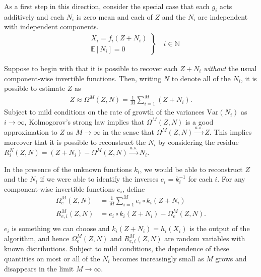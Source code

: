 As a first step in this direction, consider the special case that each ${g}_i$ acts additively and each $N_i$ is zero mean and each of $Z$ and the $N_i$ are independent with independent components.
\begin{align}
\left.
\begin{array}{ll}
&X_{i}={f}_{i}(Z + N_{i}) \\
&\mathbb{E}[N_i]= 0
\end{array}
\right\rbrace \quad i \in \mathbb{N}
\end{align}

Suppose to begin with that it is possible to recover each $Z + N_i$ \emph{without} the usual component-wise invertible functions. Then, writing $N$ to denote all of the $N_i$, it is possible to estimate $Z$ as
\begin{align*}
Z \approx \Omega^M(Z, N) = \frac{1}{M}\sum_{i=1}^M \left(Z + N_i\right).
\end{align*}
Subject to mild conditions on the rate of growth of the variances $\text{Var}(N_i)$ as $i\to\infty$, Kolmogorov's strong law implies that $\Omega^M(Z, N)$ is a good approximation to $Z$ as $M\to\infty$ in the sense that  $\Omega^M(Z, N) \overset{a.s.}{\longrightarrow} Z$.
This implies moreover that it is possible to reconstruct the $N_i$ by considering the residue $R^N_i(Z, N) = (Z + N_i) - \Omega^M(Z, N) \overset{a.s.}{\longrightarrow} N_i$.

In the presence of the unknown functions ${k}_i$, we would be able to reconstruct $Z$ and the $N_i$ if we were able to identify the inverses ${e}_i = {k}_i^{-1}$ for each $i$.
For any component-wise invertible functions ${e}_i$, define
\begin{align*}
\Omega_{e}^M(Z, N) &= \frac{1}{M} \sum_{i=1}^M {e}_i\circ {k}_i( Z + N_i) \\
R_{{e}, i}^M(Z, N) &= {e}_i\circ {k}_i( Z + N_i) - \Omega_{{e}}^M(Z, N).\\
\end{align*}
${e}_i$ is something we can choose and ${k}_i(Z+N_i) = {h}_i({X}_i)$ is the output of the algorithm, and hence $\Omega_{e}^M(Z, N)$ and $R_{{e}, i}^M(Z, N)$ are random variables with known distributions.
Subject to mild conditions, the dependence of these quantities on most or all of the $N_i$ becomes increasingly small as $M$ grows and disappears in the limit $M\to\infty$.

\medskip

